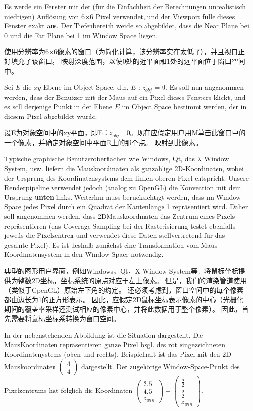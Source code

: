 \documentclass[fleqn]{article}
\begin{document}
Es werde ein Fenster mit der (für die Einfachheit der Berechnungen unrealistisch niedrigen)
 Auflösung von 6$\times$6 Pixel verwendet, und der Viewport fülle dieses Fenster exakt aus. Der Tiefenbereich werde so abgebildet, dass die Near Plane bei 0 und die Far Plane bei 1 im Window Space liegen.

 使用分辨率为6$\times$6像素的窗口（为简化计算，该分辨率实在太低了），并且视口正好填充了该窗口。 映射深度范围，以使0处的近平面和1处的远平面位于窗口空间中。

Sei $E$ die $xy$-Ebene im Object Space, d.h. $E$ : $z_{obj}$ = 0.
 Es soll nun angenommen werden, dass der Benutzer mit der Maus auf ein Pixel dieses Fensters klickt, und es soll derjenige Punkt in der Ebene $E$ im Object Space bestimmt werden, der in diesem Pixel abgebildet wurde.

 设E为对象空间中的xy平面，即E：$z_{obj}$ =0。现在应假定用户用M单击此窗口中的一个像素，并确定对象空间中平面E上的那个点。 映射到此像素。

Typische graphische Benutzeroberflächen wie Windows, Qt,
 das X Window System, usw. liefern die Mauskoordinaten als ganzahlige 2D-Koordinaten, 
 wobei der Ursprung des Koordinatensystems dem linken oberen Pixel entspricht. 
 Unsere Renderpipeline verwendet jedoch (analog zu OpenGL) die Konvention 
 mit dem Ursprung \textbf{unten} links. Weiterhin muss berücksichtigt werden, 
 dass im Window Space jedes Pixel durch ein Quadrat der Kantenlänge 1 
 repräsentiert wird. Daher soll angenommen werden, dass 2DMauskoordinaten das 
 Zentrum eines Pixels repräsentieren (das Coverage Sampling bei der 
 Rasterisierung testet ebenfalls jeweils die Pixelzentren und verwendet 
 diese Daten stellvertretend für das gesamte Pixel). Es ist deshalb 
 zunächst eine Transformation vom Maus-Koordinatensystem in den Window Space notwendig.

 典型的图形用户界面，例如Windows，Qt，X Window System等，将鼠标坐标提供为整数2D坐标，坐标系统的原点对应于左上像素。 但是，我们的渲染管道使用（类似于OpenGL）原始左下角的约定。 还必须考虑到，窗口空间中的每个像素都由边长为1的正方形表示。 因此，应假定2D鼠标坐标表示像素的中心（光栅化期间的覆盖率采样还测试相应的像素中心，并将此数据用于整个像素）。 因此，首先需要将鼠标坐标系转换为窗口空间。

In der nebenstehenden Abbildung ist die Situation dargestellt. Die MausKoordinaten repräsentieren ganze Pixel bzgl. des rot eingezeichneten Koordinatenystems (oben und rechts). Beispielhaft ist das Pixel mit den 2D-Mauskoordinaten
$\begin{pmatrix}
     4\\4
 \end{pmatrix}$ dargestellt. Der zugehörige Window-Space-Punkt des Pixelzentrums hat folglich die Koordinaten
$\begin{pmatrix}
    2.5\\4.5\\z_{win}
\end{pmatrix}=\begin{pmatrix}
    \frac{5}{2}\\\frac{9}{2}\\z_{win}
\end{pmatrix}$.
\end{document}
